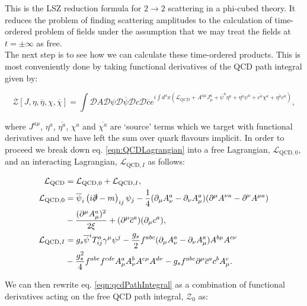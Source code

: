	This is the LSZ reduction formula for $2\rightarrow2$ scattering in a phi-cubed theory.  It reduces the problem of finding scattering
	amplitudes to the calculation of time-ordered problem of fields under the assumption that we may treat the fields at $t=\pm\infty$
	as free.\\The next step is to see how we can calculate these time-ordered products. This is most conveniently done by taking
	functional derivatives of the QCD path integral given by:

	\begin{equation}
		\mathcal{Z}[J, \eta, \overline{\eta}, \chi, \overline{\chi}] = \int\mathcal{D}A\mathcal{D}\psi\mathcal{D}\overline{\psi}
		\mathcal{D}c\mathcal{D}\overline{c} e^{i\int d^4x(\mathcal{L}_{QCD} + A^{a\mu} J_\mu^a + \overline{\psi}^a\eta^a +
		\overline{\eta^a}\psi^a + \overline{c^a}\chi^a + \overline{\eta^a}c^a)},
		\label{eqn:qcdPathIntegral}
	\end{equation}

	where $J^{a\mu}$, $\eta^a$, $\overline{\eta^a}$, $\chi^a$ and $\overline{\chi^a}$ are `source' terms which we target with functional
	derivatives and we have left the sum over quark flavours implicit.  In order to proceed we break down eq. \eqref{eqn:QCDLagrangian}
	into a free Lagrangian, $\mathcal{L}_{\text{QCD}, 0}$, and an interacting Lagrangian, $\mathcal{L}_{\text{QCD}, I}$ as follows:

	\begin{align*}
		\mathcal{L}_{\text{QCD}}    &= \mathcal{L}_{\text{QCD}, 0} + \mathcal{L}_{\text{QCD}, I},\\
		\mathcal{L}_{\text{QCD}, 0} &=  \overline{\psi}_i\left(i\slashed \partial-m\right)_{ij}\psi_j -
		\frac{1}{4}(\partial_{\mu}A_{\nu}^a - \partial_{\nu}A_{\mu}^a)(\partial^{\mu}A^{\nu a} - \partial^{\nu}A^{\mu a}) \\
		&-\frac{(\partial^\mu A_\mu^a)^2}{2\xi} + (\partial^\mu \overline{c}^{a})(\partial_\mu c^a),\\
		\mathcal{L}_{\text{QCD}, I} &= g_s\overline{\psi}^i T^a_{ij}\gamma^\mu\psi^j - \frac{g_s}{2}f^{abc}(\partial_{\mu}A^a_{\nu} -
		\partial_{\nu}A^a_{\mu})A^{b\mu}A^{c\nu} \\ &-\frac{g_s^2}{4}f^{abe}f^{cde}A^a_\mu A^b_\nu A^{c\mu}A^{d\nu} -
		g_sf^{abc}\partial^\mu \overline{c}^{a}c^bA^c_\mu.
	\end{align*}

	We can then rewrite eq. \eqref{eqn:qcdPathIntegral} as a combination of functional derivatives acting on the free QCD path integral,
	$\mathcal{Z}_0$ as:

